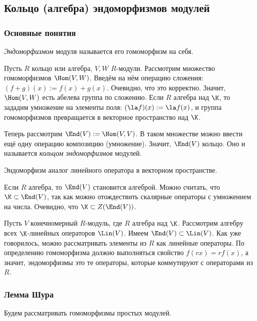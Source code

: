 \documentclass[a4paper]{article}
\begin{document}
\subsection{Кольцо (алгебра) эндоморфизмов модулей}

\subsubsection{Основные понятия}

\begin{df}
\emph{Эндоморфизмом} модуля называется его гомоморфизм на себя.
\end{df}

Пусть $R$ кольцо или алгебра, $V, W$ $R$-модули. Рассмотрим множество гомоморфизмов $\Hom(V,W)$.
Введём на нём операцию сложения: $(f+g)(x):=f(x)+g(x)$. Очевидно, что это корректно. Значит, $\Hom(V,W)$ есть
абелева группа по сложению. Если $R$ алгебра над $\K$, то зададим умножение на элементы поля: $(\la
f)(x):=\la f(x)$, и группа гомоморфизмов превращается в векторное пространство над $\K$.

Теперь рассмотрим $\End(V):=\Hom(V,V)$. В таком множестве можно ввести ещё одну операцию  композицию
(умножение). Значит, $\End(V)$ кольцо. Оно и называется \emph{\emph{кольцом эндоморфизмов}} модулей.

\begin{note}
Эндоморфизм аналог линейного оператора в векторном пространстве.
\end{note}

Если $R$ алгебра, то $\End(V)$ становится алгеброй. Можно считать, что $\K \subset \End(V)$, так как
можно отождествить скалярные операторы с умножением на числа. Очевидно, что $\K \subset Z(\End(V))$.

Пусть $V$ конечномерный $R$-модуль, где $R$ алгебра над $\K$. Рассмотрим алгебру всех $\K$-линейных
операторов $\Lin(V)$. Имеем $\End(V) \subset \Lin(V)$. Как уже говорилось, можно рассматривать элементы из
$R$ как линейные операторы. По определению гомоморфизма должно выполняться свойство $f(rx)=rf(x)$, а значит,
эндоморфизмы это те операторы, которые коммутируют с операторами из $R$.

\subsubsection{Лемма Шура}

Будем рассматривать гомоморфизмы простых модулей.
\end{document}
